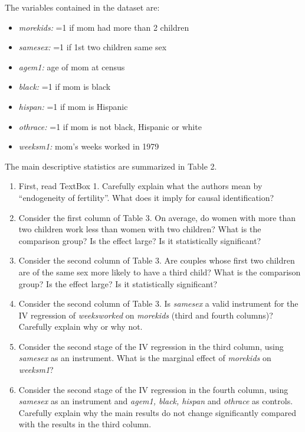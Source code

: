 \documentclass{article}
\begin{document}
The variables contained in the dataset are:
\begin{itemize}
    \item \textit{morekids:}  =1 if mom had more than 2 children
    \item \textit{samesex:} =1 if 1st two children same sex
    \item \textit{agem1:} age of mom at census
    \item \textit{black:} =1 if mom is black
    \item \textit{hispan:} =1 if mom is Hispanic
    \item \textit{othrace:} =1 if mom is not black, Hispanic or white
    \item \textit{weeksm1:}  mom's weeks worked in 1979
\end{itemize}
\vspace{.5cm}
The main descriptive statistics are summarized in Table 2.


\begin{enumerate}[label=\alph*)]

\item First, read TextBox 1. Carefully explain what the authors mean by ``endogeneity of fertility''. What does it imply for causal identification? 
\item Consider the first column of Table 3. On average, do women with more than two children work less than women with two children? What is the comparison group? Is the effect large? Is it statistically significant? 
\item Consider the second column of Table 3. Are couples whose first two children are of the same sex more likely to have a third child? What is the comparison group? Is the effect large? Is it statistically significant?
\item  Consider the second column of Table 3. Is \textit{samesex} a valid instrument for the IV regression of \textit{weeksworked} on \textit{morekids} (third and fourth columns)? Carefully explain why or why not.
\item Consider the second stage of the IV regression in the third column, using \textit{samesex} as an instrument. What is the marginal effect of \textit{morekids} on \textit{weeksm1}?
\item  Consider the second stage of the IV regression in the fourth column, using \textit{samesex} as an instrument and \textit{agem1, black, hispan} and \textit{othrace} as controls. Carefully explain why the main results do not change significantly compared with the results in the third column.
\end{enumerate}
\end{document}
